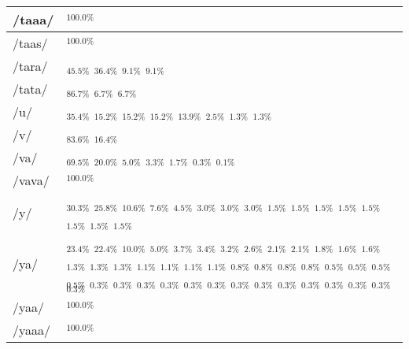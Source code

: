 \documentclass{article}
\begin{document}
\begin{longtable}{|l|p{}|}
/taaa/ & \textIndus{}$_{100.0\%}$ \\ \hline
/taas/ & \textIndus{}$_{100.0\%}$ \\ \hline
/tara/ & \textIndus{}$_{45.5\%}$ \quad \textIndus{}$_{36.4\%}$ \quad \textIndus{}$_{9.1\%}$ \quad \textIndus{}$_{9.1\%}$ \\ \hline
/tata/ & \textIndus{}$_{86.7\%}$ \quad \textIndus{}$_{6.7\%}$ \quad \textIndus{}$_{6.7\%}$ \\ \hline
/u/ & \textIndus{}$_{35.4\%}$ \quad \textIndus{}$_{15.2\%}$ \quad \textIndus{}$_{15.2\%}$ \quad \textIndus{}$_{15.2\%}$ \quad \textIndus{}$_{13.9\%}$ \quad \textIndus{}$_{2.5\%}$ \quad \textIndus{}$_{1.3\%}$ \quad \textIndus{}$_{1.3\%}$ \\ \hline
/v/ & \textIndus{}$_{83.6\%}$ \quad \textIndus{}$_{16.4\%}$ \\ \hline
/va/ & \textIndus{}$_{69.5\%}$ \quad \textIndus{}$_{20.0\%}$ \quad \textIndus{}$_{5.0\%}$ \quad \textIndus{}$_{3.3\%}$ \quad \textIndus{}$_{1.7\%}$ \quad \textIndus{}$_{0.3\%}$ \quad \textIndus{}$_{0.1\%}$ \\ \hline
/vava/ & \textIndus{}$_{100.0\%}$ \\ \hline
/y/ & \textIndus{}$_{30.3\%}$ \quad \textIndus{}$_{25.8\%}$ \quad \textIndus{}$_{10.6\%}$ \quad \textIndus{}$_{7.6\%}$ \quad \textIndus{}$_{4.5\%}$ \quad \textIndus{}$_{3.0\%}$ \quad \textIndus{}$_{3.0\%}$ \quad \textIndus{}$_{3.0\%}$ \quad \textIndus{}$_{1.5\%}$ \quad \textIndus{}$_{1.5\%}$ \quad \textIndus{}$_{1.5\%}$ \quad \textIndus{}$_{1.5\%}$ \quad \textIndus{}$_{1.5\%}$ \quad \textIndus{}$_{1.5\%}$ \quad \textIndus{}$_{1.5\%}$ \quad \textIndus{}$_{1.5\%}$ \\ \hline
/ya/ & \textIndus{}$_{23.4\%}$ \quad \textIndus{}$_{22.4\%}$ \quad \textIndus{}$_{10.0\%}$ \quad \textIndus{}$_{5.0\%}$ \quad \textIndus{}$_{3.7\%}$ \quad \textIndus{}$_{3.4\%}$ \quad \textIndus{}$_{3.2\%}$ \quad \textIndus{}$_{2.6\%}$ \quad \textIndus{}$_{2.1\%}$ \quad \textIndus{}$_{2.1\%}$ \quad \textIndus{}$_{1.8\%}$ \quad \textIndus{}$_{1.6\%}$ \quad \textIndus{}$_{1.6\%}$ \quad \textIndus{}$_{1.3\%}$ \quad \textIndus{}$_{1.3\%}$ \quad \textIndus{}$_{1.3\%}$ \quad \textIndus{}$_{1.1\%}$ \quad \textIndus{}$_{1.1\%}$ \quad \textIndus{}$_{1.1\%}$ \quad \textIndus{}$_{1.1\%}$ \quad \textIndus{}$_{0.8\%}$ \quad \textIndus{}$_{0.8\%}$ \quad \textIndus{}$_{0.8\%}$ \quad \textIndus{}$_{0.8\%}$ \quad \textIndus{}$_{0.5\%}$ \quad \textIndus{}$_{0.5\%}$ \quad \textIndus{}$_{0.5\%}$ \quad \textIndus{}$_{0.5\%}$ \quad \textIndus{}$_{0.3\%}$ \quad \textIndus{}$_{0.3\%}$ \quad \textIndus{}$_{0.3\%}$ \quad \textIndus{}$_{0.3\%}$ \quad \textIndus{}$_{0.3\%}$ \quad \textIndus{}$_{0.3\%}$ \quad \textIndus{}$_{0.3\%}$ \quad \textIndus{}$_{0.3\%}$ \quad \textIndus{}$_{0.3\%}$ \quad \textIndus{}$_{0.3\%}$ \quad \textIndus{}$_{0.3\%}$ \quad \textIndus{}$_{0.3\%}$ \quad \textIndus{}$_{0.3\%}$ \quad \textIndus{}$_{0.3\%}$ \\ \hline
/yaa/ & \textIndus{}$_{100.0\%}$ \\ \hline
/yaaa/ & \textIndus{}$_{100.0\%}$ \\ \hline
\end{longtable}
\end{document}
